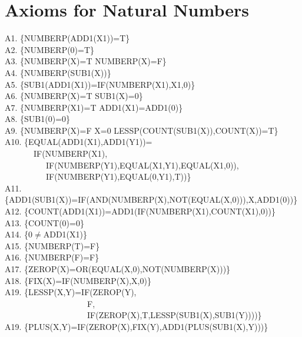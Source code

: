 \documentclass[10pt]{book}
\newenvironment{pubasis}{\begin{flushleft}}{\end{flushleft}}
\begin{document}
\section{Axioms for Natural Numbers}
\begin{pubasis}
A1.   \{NUMBERP(ADD1(X1))=T\}\\

A2.   \{NUMBERP(0)=T\}\\

A3.   \{NUMBERP(X)=T NUMBERP(X)=F\}\\

A4.   \{NUMBERP(SUB1(X))\}\\

A5.   \{SUB1(ADD1(X1))=IF(NUMBERP(X1),X1,0)\}\\

A6.   \{NUMBERP(X)=T SUB1(X)=0\}\\

A7.   \{NUMBERP(X1)=T ADD1(X1)=ADD1(0)\}\\

A8.   \{SUB1(0)=0\}\\

A9.   \{NUMBERP(X)=F X=0 LESSP(COUNT(SUB1(X)),COUNT(X))=T\}\\

A10.  \{EQUAL(ADD1(X1),ADD1(Y1))=\\
~~~~~~~IF(NUMBERP(X1),\\
~~~~~~~~~~IF(NUMBERP(Y1),EQUAL(X1,Y1),EQUAL(X1,0)),\\
~~~~~~~~~~IF(NUMBERP(Y1),EQUAL(0,Y1),T))\}\\

A11.  \{ADD1(SUB1(X))=IF(AND(NUMBERP(X),NOT(EQUAL(X,0))),X,ADD1(0))\}\\

A12.  \{COUNT(ADD1(X1))=ADD1(IF(NUMBERP(X1),COUNT(X1),0))\}\\

A13.  \{COUNT(0)=0\}\\

A14.  \{0$\neq$ADD1(X1)\}\\

A15.  \{NUMBERP(T)=F\}\\

A16.  \{NUMBERP(F)=F\}\\

A17.  \{ZEROP(X)=OR(EQUAL(X,0),NOT(NUMBERP(X)))\}\\

A18.  \{FIX(X)=IF(NUMBERP(X),X,0)\}\\

A19.  \{LESSP(X,Y)=IF(ZEROP(Y),\\
~~~~~~~~~~~~~~~~~~~~F,\\
~~~~~~~~~~~~~~~~~~~~IF(ZEROP(X),T,LESSP(SUB1(X),SUB1(Y))))\}\\

A19.  \{PLUS(X,Y)=IF(ZEROP(X),FIX(Y),ADD1(PLUS(SUB1(X),Y)))\}\\
\end{pubasis}
\end{document}
